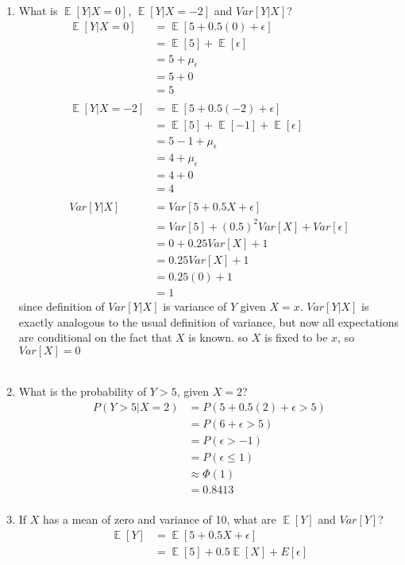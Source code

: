 \documentclass{article}
\DeclareMathOperator{\E}{\mathbb{E}}
\begin{document}
\begin{enumerate}
\item What is $\E[Y|X = 0]$, $\E[Y|X = -2]$ and $Var[Y|X]$?
\begin{align*}
\E[Y|X = 0] &= \E[5 + 0.5(0) + \epsilon]\\
&= \E[5] + \E[\epsilon]\\
&= 5 + \mu_{\epsilon}\\
&= 5 + 0\\
&= 5\\
\\
\E[Y|X = -2] &= \E[5 + 0.5(-2) + \epsilon]\\
&= \E[5] + \E[-1] + \E[\epsilon]\\
&= 5 - 1 + \mu_{\epsilon}\\
&= 4 + \mu_{\epsilon}\\
&= 4 + 0\\
&= 4\\
\\
Var[Y|X] &= Var[5 + 0.5X + \epsilon]\\
&= Var[5] + (0.5) ^ 2 Var[X] + Var[\epsilon]\\
&= 0 + 0.25 Var[X] + 1\\
&= 0.25 Var[X] + 1\\
&= 0.25(0) + 1\\
&= 1
\end{align*}
since definition of $Var[Y | X]$ is variance of $Y$ given $X = x$. $Var[Y | X]$ is exactly analogous to the usual definition of variance, but now all expectations are conditional on the fact that $X$ is known. so $X$ is fixed to be $x$, so $Var[X] = 0$\\
\\
\item What is the probability of $Y > 5$, given $X = 2$?
\begin{align*}
P(Y > 5 | X = 2) &= P(5 + 0.5(2) + \epsilon > 5)\\
&= P(6 + \epsilon > 5)\\
&= P(\epsilon > -1)\\
&= P(\epsilon \leq 1)\\
&\approx \Phi(1)\\
&= 0.8413\\
\end{align*}
\item If $X$ has a mean of zero and variance of 10, what are $\E[Y]$ and $Var[Y]$?
\begin{align*}
\E[Y] &= \E[5 + 0.5X + \epsilon]\\
&= \E[5] + 0.5\E[X] + E[\epsilon]\\

\end{align*}
\end{enumerate}
\end{document}
